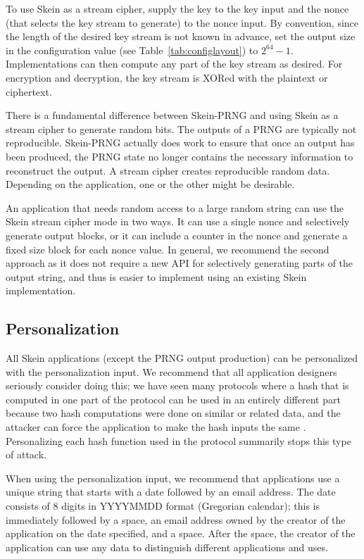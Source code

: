 \documentclass[11pt,twoside]{article}
\begin{document}
To use Skein as a stream cipher, supply the key to the key input and the nonce (that selects the key stream to generate) to the nonce input.  By convention, since the length of the desired key stream is not known in advance, set the output size in the configuration value (see Table~\ref{tab:configlayout}) to $2^{64}-1$.  Implementations can then compute any part of the key stream as desired. For encryption and decryption, the key stream is XORed with the plaintext or ciphertext.

There is a fundamental difference between Skein-PRNG and using Skein as a stream cipher to generate random bits.  The outputs of a PRNG are typically not reproducible.  Skein-PRNG actually does work to ensure that once an output has been produced, the PRNG state no longer contains the necessary information to reconstruct the output.  A stream cipher creates reproducible random data.  Depending on the application, one or the other might be desirable.

An application that needs random access to a large random string can use the Skein stream cipher mode in two ways.  It can use a single nonce and selectively generate output blocks, or it can include a counter in the nonce and generate a fixed size block for each nonce value.  In general, we recommend the second approach as it does not require a new API for selectively generating parts of the output string, and thus is easier to implement using an existing Skein implementation.

\subsection{Personalization}

All Skein applications (except the PRNG output production) can be personalized with the personalization input.  We recommend that all application designers seriously consider doing this; we have seen many protocols where a hash that is computed in one part of the protocol can be used in an entirely different part because two hash computations were done on similar or related data, and the attacker can force the application to make the hash inputs the same \cite{KSW98,FS99}. Personalizing each hash function used in the protocol summarily stops this type of attack.

When using the personalization input, we recommend that applications use a unique string that starts with a date followed by an email address. The date consists of 8 digits in YYYYMMDD format (Gregorian calendar); this is immediately followed by a space, an email address owned by the creator of the application on the date specified, and a space.  After the space, the creator of the application can use any data to distinguish different applications and uses.
\end{document}
